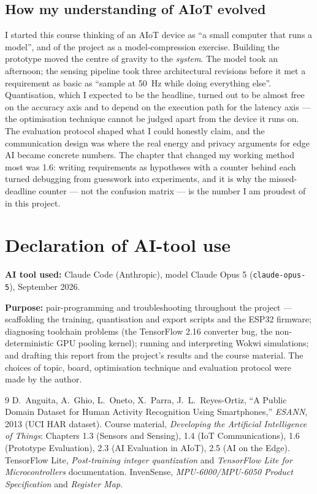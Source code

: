 \documentclass[10pt,a4paper]{article}
\begin{document}
\subsection{How my understanding of AIoT evolved}

I started this course thinking of an AIoT device as ``a small computer that runs a model'', and of the project as a model-compression exercise. Building the prototype moved the centre of gravity to the \emph{system}. The model took an afternoon; the sensing pipeline took three architectural revisions before it met a requirement as basic as ``sample at \SI{50}{\hertz} while doing everything else''. Quantisation, which I expected to be the headline, turned out to be almost free on the accuracy axis and to depend on the execution path for the latency axis --- the optimisation technique cannot be judged apart from the device it runs on. The evaluation protocol shaped what I could honestly claim, and the communication design was where the real energy and privacy arguments for edge AI became concrete numbers. The chapter that changed my working method most was 1.6: writing requirements as hypotheses with a counter behind each turned debugging from guesswork into experiments, and it is why the missed-deadline counter --- not the confusion matrix --- is the number I am proudest of in this project.

\section{Declaration of AI-tool use}

\textbf{AI tool used:} Claude Code (Anthropic), model Claude Opus 5 (\texttt{claude-opus-5}), September 2026.

\textbf{Purpose:} pair-programming and troubleshooting throughout the project --- scaffolding the training, quantisation and export scripts and the ESP32 firmware; diagnosing toolchain problems (the TensorFlow 2.16 converter bug, the non-deterministic GPU pooling kernel); running and interpreting Wokwi simulations; and drafting this report from the project's results and the course material. The choices of topic, board, optimisation technique and evaluation protocol were made by the author.


\begin{thebibliography}{9}\small
{} D.~Anguita, A.~Ghio, L.~Oneto, X.~Parra, J.~L.~Reyes-Ortiz, ``A Public Domain Dataset for Human Activity Recognition Using Smartphones,'' \emph{ESANN}, 2013 (UCI HAR dataset).
 Course material, \emph{Developing the Artificial Intelligence of Things}: Chapters 1.3 (Sensors and Sensing), 1.4 (IoT Communications), 1.6 (Prototype Evaluation), 2.3 (AI Evaluation in AIoT), 2.5 (AI on the Edge).
 TensorFlow Lite, \emph{Post-training integer quantization} and \emph{TensorFlow Lite for Microcontrollers} documentation.
 InvenSense, \emph{MPU-6000/MPU-6050 Product Specification} and \emph{Register Map}.
\end{thebibliography}
\end{document}
